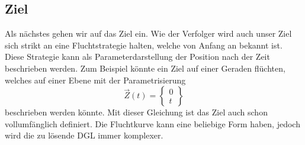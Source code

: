 \subsection{Ziel
\label{lambertw:subsection:Ziel}}
Als nächstes gehen wir auf das Ziel ein.
Wie der Verfolger wird auch unser Ziel sich strikt an eine Fluchtstrategie halten, welche von Anfang an bekannt ist.
Diese Strategie kann als Parameterdarstellung der Position nach der Zeit beschrieben werden.
Zum Beispiel könnte ein Ziel auf einer Geraden flüchten, welches auf einer Ebene mit der Parametrisierung
\begin{equation}
    \vec{Z}(t)
    =
    \begin{Bmatrix}
        0\\
        t
    \end{Bmatrix}
\end{equation}
beschrieben werden könnte.
Mit dieser Gleichung ist das Ziel auch schon vollumfänglich definiert.
Die Fluchtkurve kann eine beliebige Form haben, jedoch wird die zu lösende DGL immer komplexer.




